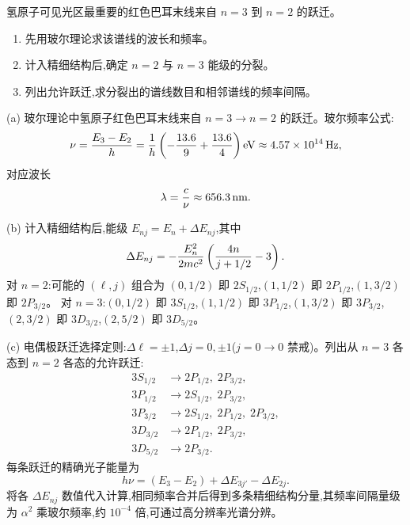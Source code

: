 \begin{question}
氢原子可见光区最重要的红色巴耳末线来自 $n=3$ 到 $n=2$ 的跃迁。
\begin{enumerate}
\item 先用玻尔理论求该谱线的波长和频率。
\item 计入精细结构后,确定 $n=2$ 与 $n=3$ 能级的分裂。
\item 列出允许跃迁,求分裂出的谱线数目和相邻谱线的频率间隔。
\end{enumerate}
\begin{solution}
(a) 玻尔理论中氢原子红色巴耳末线来自 $n=3\to n=2$ 的跃迁。玻尔频率公式:
\[
\nu={E_3-E_2\over h}
={1\over h}\left(-{13.6\over9}+{13.6\over4}\right)\mathrm{eV}
\approx 4.57\times10^{14}\,\mathrm{Hz},
\]
对应波长
\[
\lambda={c\over\nu}\approx 656.3\,\mathrm{nm}.
\]

(b) 计入精细结构后,能级 $E_{nj}=E_n+\Delta E_{nj}$,其中
\[
\Delta E_{nj}=-{E_n^2\over2mc^2}\left({4n\over j+1/2}-3\right).
\]
对 $n=2$:可能的 $(\ell,j)$ 组合为 $(0,1/2)$ 即 $2S_{1/2}$,$(1,1/2)$ 即 $2P_{1/2}$,$(1,3/2)$ 即 $2P_{3/2}$。
对 $n=3$:$(0,1/2)$ 即 $3S_{1/2}$,$(1,1/2)$ 即 $3P_{1/2}$,$(1,3/2)$ 即 $3P_{3/2}$,$(2,3/2)$ 即 $3D_{3/2}$,$(2,5/2)$ 即 $3D_{5/2}$。

(c) 电偶极跃迁选择定则:$\Delta\ell=\pm1$,$\Delta j=0,\pm1$($j=0\to0$ 禁戒)。列出从 $n=3$ 各态到 $n=2$ 各态的允许跃迁:
\[
\begin{aligned}
3S_{1/2} &\to 2P_{1/2},\; 2P_{3/2},\\
3P_{1/2} &\to 2S_{1/2},\; 2P_{3/2},\\
3P_{3/2} &\to 2S_{1/2},\; 2P_{1/2},\; 2P_{3/2},\\
3D_{3/2} &\to 2P_{1/2},\; 2P_{3/2},\\
3D_{5/2} &\to 2P_{3/2}.
\end{aligned}
\]
每条跃迁的精确光子能量为
\[
h\nu = (E_3-E_2) + \Delta E_{3j'} - \Delta E_{2j}.
\]
将各 $\Delta E_{nj}$ 数值代入计算,相同频率合并后得到多条精细结构分量,其频率间隔量级为 $\alpha^2$ 乘玻尔频率,约 $10^{-4}$ 倍,可通过高分辨率光谱分辨。
\end{solution}
\end{question}

